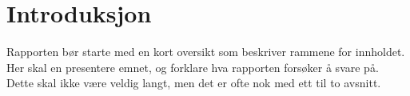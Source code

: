 \documentclass[../main-no.tex]{subfiles}
\begin{document}
\section{Introduksjon}
 Rapporten bør starte med en kort oversikt som beskriver rammene for innholdet. Her skal en presentere emnet, og forklare hva rapporten forsøker å svare på. Dette skal ikke være veldig langt, men det er ofte nok med ett til to avsnitt. \\
 
\end{document}
